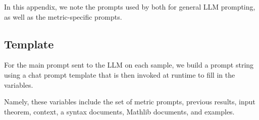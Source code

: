 \label{app:config_improver}

In this appendix, we note the prompts used by \methodname{} both for general LLM prompting, as well as the metric-specific prompts.

\subsection{Template}
\label{template}

For the main prompt sent to the LLM on each sample, we build a prompt string using a chat prompt template that is then invoked at runtime to fill in the variables.

Namely, these variables include the set of metric prompts, previous results, input theorem, context, a syntax documents, Mathlib documents, and examples. 

